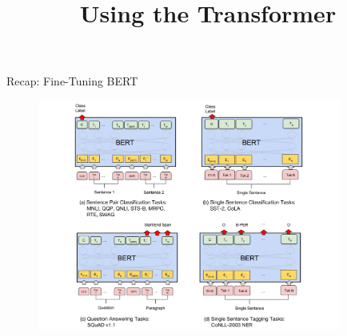 


\usepackage{movie15}
\usepackage{animate}

\def\myblue#1{\textcolor{texblue}{#1}}

\newcommand{\titlefigure}{figure/sesamestreet.jpeg}
\newcommand{\learninggoals}{
\item shortcomings of BERT \& Co.
\item everything as text-to-text
\item Dynamic Masking}

\title{Using the Transformer}
\date{}




\begin{frame}{Recap: Fine-Tuning BERT}
	\begin{figure}
	\centering
		\includegraphics[width = 10cm]{../chapter04-bert/figure/bert-finetune.png}\\ 
	\end{figure}
\end{frame}


